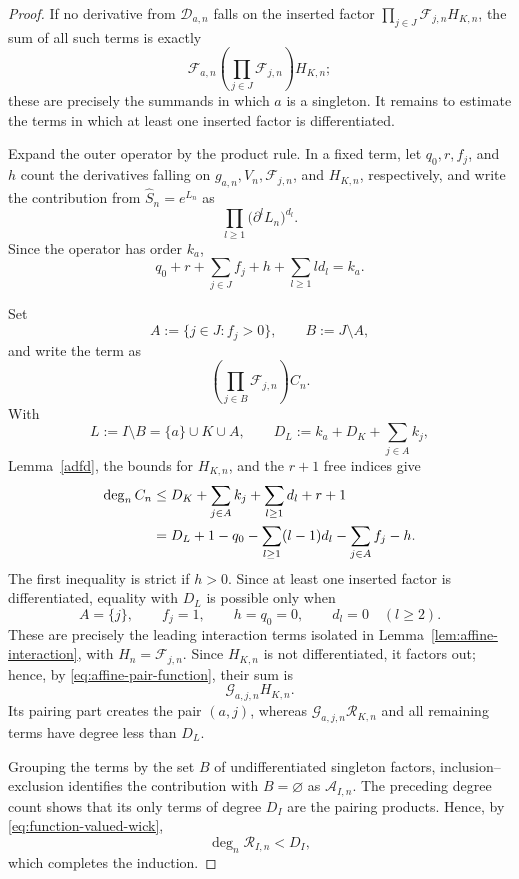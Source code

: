 \documentclass[11pt]{amsart}
\theoremstyle{plain}
\renewcommand\ell{l}
\numberwithin{equation}{section}
\numberwithin{theorem}{section}
\numberwithin{figure}{section}
\begin{document}
\begin{proof}
If no derivative from \(\mathscr D_{a,n}\) falls on the inserted factor
\(\prod_{j\in J}\mathcal F_{j,n}H_{K,n}\), the sum of all such terms is
exactly
\[
    \mathcal F_{a,n}
    \left(\prod_{j\in J}\mathcal F_{j,n}\right)H_{K,n};
\]
these are precisely the summands in which \(a\) is a singleton.  It
remains to estimate the terms in which at least one inserted factor is
differentiated.

Expand the outer operator by the product rule. In a fixed term, let
\(q_0,r,f_j\), and \(h\) count the derivatives falling on
\(g_{a,n},V_n,\mathcal F_{j,n}\), and \(H_{K,n}\), respectively, and
write the contribution from \(\widehat S_n=e^{L_n}\) as
\[
    \prod_{\ell\geq1}
    \bigl(\partial^\ell L_n\bigr)^{d_\ell}.
\]
Since the operator has order \(k_a\),
\begin{equation}
    q_0+r+\sum_{j\in J}f_j+h
    +\sum_{\ell\geq1}\ell d_\ell
    =k_a.
    \label{eq:function-wick-derivative-budget}
\end{equation}

Set
\[
    A:=\{j\in J:f_j>0\},
    \qquad
    B:=J\setminus A,
\]
and write the term as
\[
    \left(\prod_{j\in B}\mathcal F_{j,n}\right)C_n.
\]
With
\[
    L:=I\setminus B=\{a\}\cup K\cup A,
    \qquad
    D_L:=k_a+D_K+\sum_{j\in A}k_j,
\]
Lemma~\ref{adfd}, the bounds for \(H_{K,n}\), and the \(r+1\) free
indices give
\begin{align}
    \deg_n C_n
    &\leq
    D_K+\sum_{j\in A}k_j+\sum_{\ell\geq1}d_\ell+r+1
    \notag\\
    &=
    D_L+1-q_0
    -\sum_{\ell\geq1}(\ell-1)d_\ell
    -\sum_{j\in A}f_j-h.
    \label{eq:function-wick-degree-bound}
\end{align}
The first inequality is strict if \(h>0\). Since at least one inserted
factor is differentiated, equality with \(D_L\) is possible only when
\[
    A=\{j\},\qquad f_j=1,\qquad h=q_0=0,\qquad
    d_\ell=0\quad(\ell\geq2).
\]
These are precisely the leading interaction terms isolated in
Lemma~\ref{lem:affine-interaction}, with
\(H_n=\mathcal F_{j,n}\). Since \(H_{K,n}\) is not differentiated, it
factors out; hence, by \eqref{eq:affine-pair-function}, their sum is
\[
    \mathcal G_{a,j,n}H_{K,n}.
\] Its pairing part creates the pair
\((a,j)\), whereas
\(\mathcal G_{a,j,n}\mathcal R_{K,n}\) and all remaining terms have
degree less than \(D_L\).


Grouping the terms by the set \(B\) of undifferentiated singleton
factors, inclusion--exclusion identifies the contribution with
\(B=\varnothing\) as \(\mathcal A_{I,n}\). The preceding degree count
shows that its only terms of degree \(D_I\) are the pairing products.
Hence, by \eqref{eq:function-valued-wick},
\[
    \deg_n\mathcal R_{I,n}<D_I,
\]
which completes the induction.


\end{proof}
\end{document}

